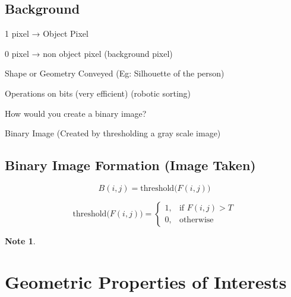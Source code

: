 \documentclass[11pt]{article}
\theoremstyle{definition}
\newtheorem*{unnote}{Note}  %
\begin{document}
\subsection{Background}
1 pixel → Object Pixel

0 pixel → non object pixel (background pixel)

Shape or Geometry Conveyed (Eg: Silhouette of the person)

Operations on bits (very efficient) (robotic sorting)

How would you create a binary image?

Binary Image (Created by thresholding a gray scale image)

\subsection{Binary Image Formation (Image Taken)}

\[
B(i,j) = \text{threshold}\big(F(i,j)\big)
\]

\[
\text{threshold}\big(F(i,j)\big) =
\begin{cases} 
1, & \text{if } F(i,j) > T \\[2mm]
0, & \text{otherwise}
\end{cases}
\]

\begin{unnote}
\end{unnote}

\newpage
\section{Geometric Properties of Interests}
\end{document}
